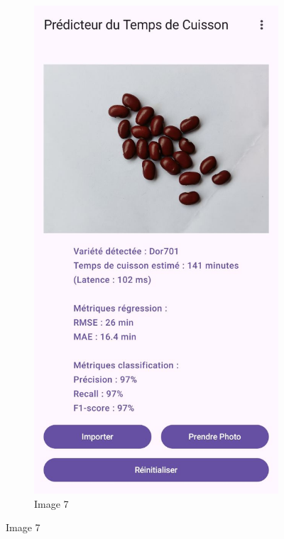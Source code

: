 \begin{figure}[H]
    \begin{subfigure}{0.24\textwidth}
        \centering
        \includegraphics[width=\linewidth]{figures/test7.jpg}
        \caption{Image 7}
    \end{subfigure}\hfill

\end{figure}
